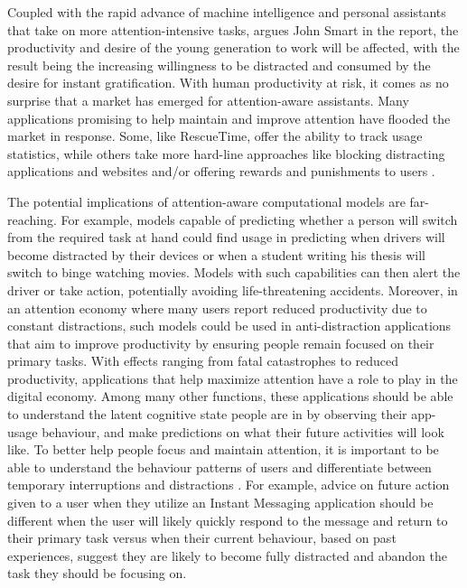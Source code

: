  Coupled with the rapid advance of machine intelligence and personal assistants that take on more attention-intensive tasks, argues John Smart in the report, the productivity and desire of the young generation to work will be affected, with the result being the increasing willingness to be distracted and consumed by the desire for instant gratification.  With human productivity at risk, it comes as no surprise that a market has emerged for attention-aware assistants. Many applications promising to help maintain and improve attention have flooded the market in response. Some, like RescueTime, offer the ability to track usage statistics, while others take more hard-line approaches like blocking distracting applications and websites and/or offering rewards and punishments to users \citep{Lyngs}.

 The potential implications of attention-aware computational models are far-reaching. For example, models capable of predicting whether a person will switch from the required task at hand could find usage in predicting when drivers will become distracted by their devices or when a student writing his thesis will switch to binge watching movies. Models with such capabilities can then alert the driver or take action, potentially avoiding life-threatening accidents. Moreover, in an attention economy \citep{davenport2013attention} where many users report reduced productivity due to constant distractions, such models could be used in anti-distraction applications that aim to improve productivity by ensuring people remain focused on their primary tasks. With effects ranging from fatal catastrophes to reduced productivity, applications that help maximize attention have a role to play in the digital economy. Among many other functions, these applications should be able to understand the latent cognitive state people are in by observing their app-usage behaviour, and make predictions on what their future activities will look like. To better help people focus and maintain attention, it is important to be able to understand the behaviour patterns of users and differentiate between temporary interruptions and distractions \citep{Lyngs}. For example, advice on future action given to a user when they utilize an Instant Messaging application should be different when the user will likely quickly respond to the message and return to their primary task versus when their current behaviour, based on past experiences, suggest they are likely to become fully distracted and abandon the task they should be focusing on. 

